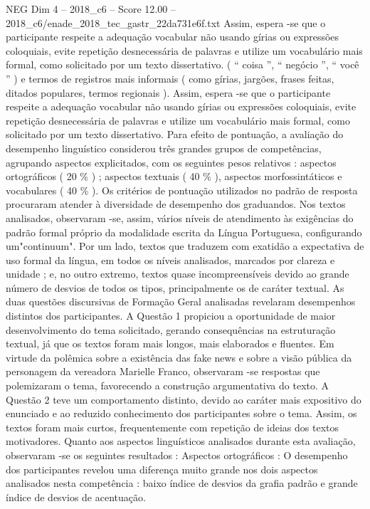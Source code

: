 \begin{textsample}{NEG Dim 4 – 2018\_c6 – Score 12.00 – 2018\_c6/enade\_2018\_tec\_gastr\_22da731e6f.txt}
Assim, espera -se que o participante respeite a adequação vocabular não usando gírias ou expressões coloquiais, evite repetição desnecessária de palavras e utilize um vocabulário mais formal, como solicitado por um texto dissertativo. ( “ coisa ”, “ negócio ”, “ você ” ) e termos de registros mais informais ( como gírias, jargões, frases feitas, ditados populares, termos regionais ).
Assim, espera -se que o participante respeite a adequação vocabular não usando gírias ou expressões coloquiais, evite repetição desnecessária de palavras e utilize um vocabulário mais formal, como solicitado por um texto dissertativo.
Para efeito de pontuação, a avaliação do desempenho linguístico considerou três grandes grupos de competências, agrupando aspectos explicitados, com os seguintes pesos relativos : aspectos ortográficos ( 20 \% ) ; aspectos textuais ( 40 \% ), aspectos morfossintáticos e vocabulares ( 40 \% ).
Os critérios de pontuação utilizados no padrão de resposta procuraram atender à diversidade de desempenho dos graduandos.
Nos textos analisados, observaram -se, assim, vários níveis de atendimento às exigências do padrão formal próprio da modalidade escrita da Língua Portuguesa, configurando um"continuum".
Por um lado, textos que traduzem com exatidão a expectativa de uso formal da língua, em todos os níveis analisados, marcados por clareza e unidade ; e, no outro extremo, textos quase incompreensíveis devido ao grande número de desvios de todos os tipos, principalmente os de caráter textual.
As duas questões discursivas de Formação Geral analisadas revelaram desempenhos distintos dos participantes.
A Questão 1 propiciou a oportunidade de maior desenvolvimento do tema solicitado, gerando consequências na estruturação textual, já que os textos foram mais longos, mais elaborados e fluentes.
Em virtude da polêmica sobre a existência das fake news e sobre a visão pública da personagem da vereadora Marielle Franco, observaram -se respostas que polemizaram o tema, favorecendo a construção argumentativa do texto.
A Questão 2 teve um comportamento distinto, devido ao caráter mais expositivo do enunciado e ao reduzido conhecimento dos participantes sobre o tema.
Assim, os textos foram mais curtos, frequentemente com repetição de ideias dos textos motivadores.
Quanto aos aspectos linguísticos analisados durante esta avaliação, observaram -se os seguintes resultados : Aspectos ortográficos : O desempenho dos participantes revelou uma diferença muito grande nos dois aspectos analisados nesta competência : baixo índice de desvios da grafia padrão e grande índice de desvios de acentuação.

\end{textsample}
